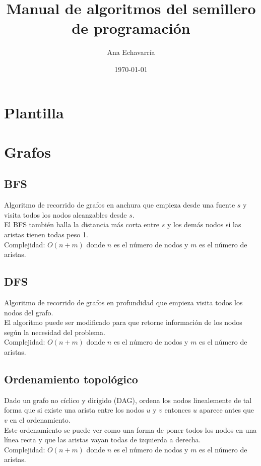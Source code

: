 \documentclass[10pt,letterpaper,twocolumn]{article}
\newcommand{\source}[1]{
	
	\dotfill
}
\begin{document}
\title{Manual de algoritmos del semillero de programación}
\author{Ana Echavarría}
\date{\today}
\maketitle

\tableofcontents

\section{Plantilla}
	\source{./src/template.cpp}

\section{Grafos}

	\subsection{BFS}
		Algoritmo de recorrido de grafos en anchura que empieza desde una fuente $s$ y visita todos los nodos alcanzables desde $s$.\\
		El BFS también halla la distancia más corta entre $s$ y los demás nodos si las aristas tienen todas peso 1.\\
		Complejidad: $O(n+m)$ donde $n$ es el número de nodos y $m$ es el número de aristas.\\
		\source{./src/bfs.cpp}
		
	\subsection{DFS}
		Algoritmo de recorrido de grafos en profundidad que empieza visita todos los nodos del grafo.\\
		El algoritmo puede ser modificado para que retorne información de los nodos según la necesidad del problema.\\
		Complejidad: $O(n+m)$ donde $n$ es el número de nodos y $m$ es el número de aristas.\\
		\source{./src/dfs.cpp}
		
	\subsection{Ordenamiento topológico}
		Dado un grafo no cíclico y dirigido (DAG), ordena los nodos linealemente de tal forma que si existe una arista entre los nodos $u$ y $v$ entonces $u$ aparece antes que $v$ en el ordenamiento.\\
		Este ordenamiento se puede ver como una forma de poner todos los nodos en una línea recta y que las aristas vayan todas de izquierda a derecha.\\
		Complejidad: $O(n+m)$ donde $n$ es el número de nodos y $m$ es el número de aristas.\\
		\source{./src/ordenamiento_topologico.cpp}
		
\end{document}
